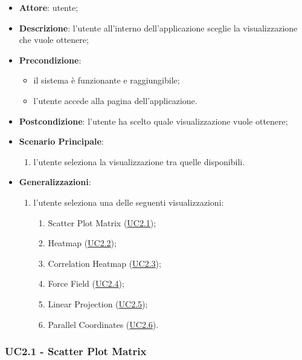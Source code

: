     \begin{itemize}
    \item \textbf{Attore}: utente;
    \item \textbf{Descrizione}: l'utente all'interno dell'applicazione sceglie la visualizzazione che vuole ottenere;
    \item \textbf{Precondizione}:
    \begin{itemize}
        \item il sistema è funzionante e raggiungibile;
        \item l'utente accede alla pagina dell'applicazione.
    \end{itemize}
    \item \textbf{Postcondizione}: l'utente ha scelto quale visualizzazione vuole ottenere;
    \item \textbf{Scenario Principale}: 
        \begin{enumerate}
            \item l'utente seleziona la visualizzazione tra quelle disponibili.
        \end{enumerate}  
    \item \textbf{Generalizzazioni}:
        \begin{enumerate}
            \item l'utente seleziona una delle seguenti visualizzazioni:
                \begin{enumerate}
                    \item Scatter Plot Matrix (\hyperref[uc2.1]{UC2.1});
                    \item Heatmap (\hyperref[uc2.2]{UC2.2});
                    \item Correlation Heatmap (\hyperref[uc2.3]{UC2.3});
                    \item Force Field (\hyperref[uc2.4]{UC2.4});
                    \item Linear Projection (\hyperref[uc2.5]{UC2.5});
                    \item Parallel Coordinates (\hyperref[uc2.6]{UC2.6}).
                \end{enumerate}
        \end{enumerate}  
    \end{itemize}
    
    \subsubsection{UC2.1 - Scatter Plot Matrix}
    \label{uc2.1}
    
